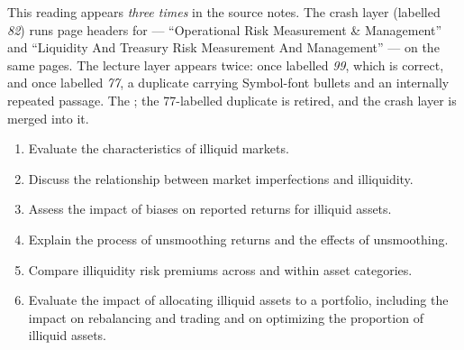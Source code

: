 

\begin{imtrapbox}[breakable=false,title={Three copies, three numbering schemes, two wrong areas}]
This reading appears \emph{three times} in the source notes. The crash layer
(labelled \emph{82}) runs page headers for 
--- ``Operational Risk Measurement \& Management'' and ``Liquidity And Treasury
Risk Measurement And Management'' --- on the same pages. The lecture layer appears
twice: once labelled \emph{99}, which is correct, and once labelled \emph{77}, a
duplicate carrying Symbol-font bullets and an internally repeated passage. The
; the 77-labelled duplicate is retired, and
the crash layer is merged into it.
\end{imtrapbox}

\begin{imkeybox}[title={The six objectives in this reading}]
\begin{enumerate}[label=\textbf{\alph*.}]
\item Evaluate the characteristics of illiquid markets.
\item Discuss the relationship between market imperfections and illiquidity.
\item Assess the impact of biases on reported returns for illiquid assets.
\item Explain the process of unsmoothing returns and the effects of unsmoothing.
\item Compare illiquidity risk premiums across and within asset categories.
\item Evaluate the impact of allocating illiquid assets to a portfolio, including the impact on rebalancing and trading and on optimizing the proportion of illiquid assets.
\end{enumerate}
\end{imkeybox}


